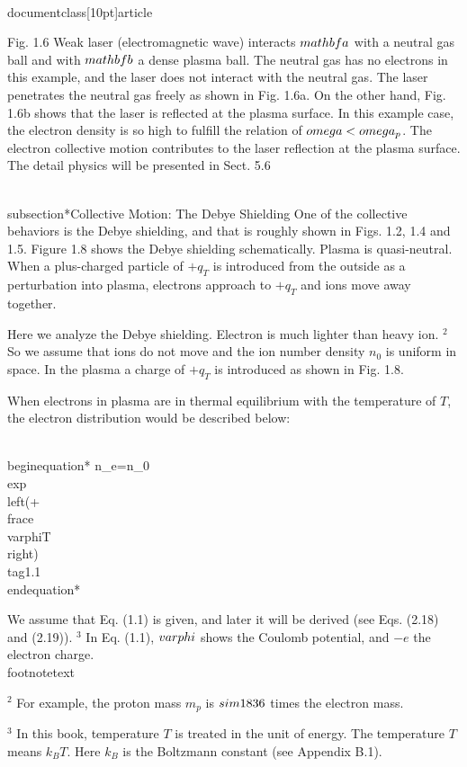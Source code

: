 \\documentclass[10pt]{article}
\begin{document}
Fig. 1.6 Weak laser (electromagnetic wave) interacts $\\mathbf{a}$ with a neutral gas ball and with $\\mathbf{b}$ a dense plasma ball. The neutral gas has no electrons in this example, and the laser does not interact with the neutral gas. The laser penetrates the neutral gas freely as shown in Fig. 1.6a. On the other hand, Fig. 1.6b shows that the laser is reflected at the plasma surface. In this example case, the electron density is so high to fulfill the relation of $\\omega<\\omega_{p}$. The electron collective motion contributes to the laser reflection at the plasma surface. The detail physics will be presented in Sect. 5.6

\\subsection*{Collective Motion: The Debye Shielding}
One of the collective behaviors is the Debye shielding, and that is roughly shown in Figs. 1.2, 1.4 and 1.5. Figure 1.8 shows the Debye shielding schematically. Plasma is quasi-neutral. When a plus-charged particle of $+q_{T}$ is introduced from the outside as a perturbation into plasma, electrons approach to $+q_{T}$ and ions move away together.

Here we analyze the Debye shielding. Electron is much lighter than heavy ion. ${ }^{2}$ So we assume that ions do not move and the ion number density $n_{0}$ is uniform in space. In the plasma a charge of $+q_{T}$ is introduced as shown in Fig. 1.8.

When electrons in plasma are in thermal equilibrium with the temperature of $T$, the electron distribution would be described below:


\\begin{equation*}
n_{e}=n_{0} \\exp \\left(+\\frac{e \\varphi}{T}\\right) \\tag{1.1}
\\end{equation*}


We assume that Eq. (1.1) is given, and later it will be derived (see Eqs. (2.18) and (2.19)). ${ }^{3}$ In Eq. (1.1), $\\varphi$ shows the Coulomb potential, and $-e$ the electron charge.
\\footnotetext{${ }^{2}$ For example, the proton mass $m_{p}$ is $\\sim 1836$ times the electron mass.

${ }^{3}$ In this book, temperature $T$ is treated in the unit of energy. The temperature $T$ means $k_{B} T$. Here $k_{B}$ is the Boltzmann constant (see Appendix B.1).
}
\end{document}
